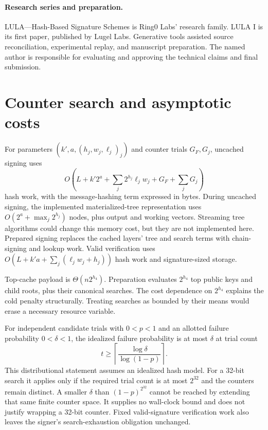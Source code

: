 \documentclass[a4paper,envcountsame,runningheads]{llncs}
\begin{document}
\paragraph{Research series and preparation.}
LULA---Hash-Based Signature Schemes is Ring0 Labs' research family. LULA I is its first paper, published by Lugel Labs. Generative tools assisted source reconciliation, experimental replay, and manuscript preparation. The named author is responsible for evaluating and approving the technical claims and final submission.



\appendix
\section{Counter search and asymptotic costs}\label{app:search}
For parameters $(k',a,(h_j,w_j,\ell_j)_j)$ and counter trials $G_F,G_j$, uncached signing uses
\[
 O\!\left(L+k'2^a+\sum_j 2^{h_j}\ell_jw_j+G_F+\sum_jG_j\right)
\]
hash work, with the message-hashing term expressed in bytes. During uncached signing, the implemented materialized-tree representation uses $O(2^a+\max_j2^{h_j})$ nodes, plus output and working vectors. Streaming tree algorithms could change this memory cost, but they are not implemented here. Prepared signing replaces the cached layers' tree and search terms with chain-signing and lookup work. Valid verification uses $O(L+k'a+\sum_j(\ell_jw_j+h_j))$ hash work and signature-sized storage.

Top-cache payload is $\Theta(n2^{h_4})$. Preparation evaluates $2^{h_4}$ top public keys and child roots, plus their canonical searches. The cost dependence on $2^{h_4}$ explains the cold penalty structurally. Treating searches as bounded by their means would erase a necessary resource variable.

For independent candidate trials with $0<p<1$ and an allotted failure probability $0<\delta<1$, the idealized failure probability is at most $\delta$ at trial count
\[
 t\ge\left\lceil\frac{\log\delta}{\log(1-p)}\right\rceil.
\]
This distributional statement assumes an idealized hash model. For a 32-bit search it applies only if the required trial count is at most $2^{32}$ and the counters remain distinct. A smaller $\delta$ than $(1-p)^{2^{32}}$ cannot be reached by extending that same finite counter space. It supplies no wall-clock bound and does not justify wrapping a 32-bit counter. Fixed valid-signature verification work also leaves the signer's search-exhaustion obligation unchanged.
\end{document}
